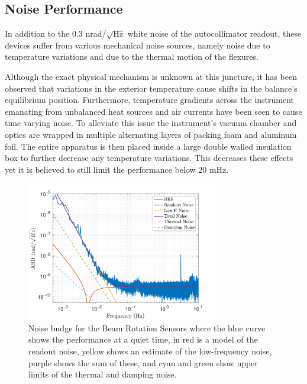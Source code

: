 \documentclass [12pt, proquest]{uwthesis}[2019]
\begin{document}
\subsection{Noise Performance}

In addition to the 0.3 nrad/$\sqrt{\text{Hz}}$ white noise of the autocollimator readout, these devices suffer from various mechanical noise sources, namely noise due to temperature variations and due to the thermal motion of the flexures.

Although the exact physical mechanism is unknown at this juncture, it has been observed that variations in the exterior temperature cause shifts in the balance's equilibrium position. Furthermore, temperature gradients across the instrument emanating from unbalanced heat sources and air currents have been seen to cause time varying noise. To alleviate this issue the instrument's vacuum chamber and optics are wrapped in multiple alternating layers of packing foam and aluminum foil. The entire apparatus is then placed inside a large double walled insulation box to further decrease any temperature variations. This decreases these effects yet it is believed to still limit the performance below 20 mHz.

\begin{figure}[!h]
\begin{center}
\includegraphics[width=0.75\textwidth]{BRSNoiseModel.pdf}
\caption[Noise budge for the Beam Rotation Sensors]{Noise budge for the Beam Rotation Sensors where the blue curve shows the performance at a quiet time, in red is a model of the readout noise, yellow shows an estimate of the low-frequency noise, purple shows the sum of these, and cyan and green show upper limits of the thermal and damping noise.}
\label{noise}
\end{center}
\end{figure}
\end{document}
